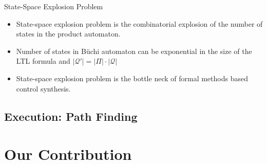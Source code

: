 \documentclass{beamer}
\newcommand{\Q}{\mathcal{Q}}
\begin{document}
\begin{frame}{State-Space Explosion Problem}
\begin{itemize}
\item State-space explosion problem is the combinatorial explosion of the number of states in the product automaton.
\item Number of states in B\"uchi automaton can be exponential in the size of the LTL formula \cite{giannakopoulou02} and $|\Q'| = |\Pi|\cdot |\Q|$ 
\item State-space explosion problem is the bottle neck of formal methods based control synthesis.
\end{itemize}
\end{frame}

\subsection{Execution: Path Finding}


\section{Our Contribution}
\end{document}
